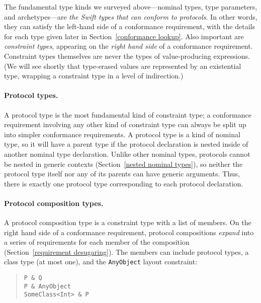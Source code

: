 \documentclass[../generics]{subfiles}
\begin{document}
The fundamental type kinds we surveyed above---nominal types, type parameters, and archetypes---are \textsl{the Swift types that can conform to protocols}. In other words, they can satisfy the left-hand side of a conformance requirement, with the details for each type given later in Section~\ref{conformance lookup}. Also important are \emph{constraint types}, appearing on the \emph{right hand side} of a conformance requirement. Constraint types themselves are never the types of value-producing expressions. (We will see shortly that type-erased values are represented by an existential type, wrapping a constraint type in a level of indirection.)

\paragraph{Protocol types.}
A protocol type is the most fundamental kind of constraint type; a conformance requirement involving any other kind of constraint type can always be split up into simpler conformance requirements. A protocol type is a kind of nominal type, so it will have a parent type if the protocol declaration is nested inside of another nominal type declaration. Unlike other nominal types, protocols cannot be nested in generic contexts (Section~\ref{nested nominal types}), so neither the protocol type itself nor any of its parents can have generic arguments. Thus, there is exactly one protocol type corresponding to each protocol declaration.

\paragraph{Protocol composition types.}
A protocol composition type is a constraint type with a list of members. On the right hand side of a conformance requirement, protocol compositions \emph{expand} into a series of requirements for each member of the composition (Section~\ref{requirement desugaring}). The members can include protocol types, a class type (at most one), and the \texttt{AnyObject} layout constraint:
\begin{quote}
\begin{verbatim}
P & Q
P & AnyObject
SomeClass<Int> & P
\end{verbatim}
\end{quote}
\end{document}
